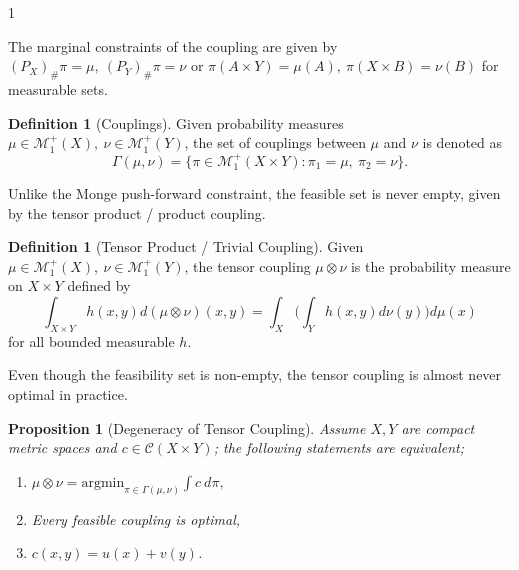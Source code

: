 \documentclass[12pt]{article}
\newtheorem{proposition}[theorem]{Proposition}
\theoremstyle{definition}
\newtheorem{definition}[theorem]{Definition}
\theoremstyle{plain}
\begin{document}
\begin{spacing}{1}
{\setlength{\parindent}{0cm}
The marginal constraints of the coupling are given by $(P_X)_\#\pi = \mu, \ (P_Y)_\#\pi = \nu$ or $\pi(A \times Y) = \mu(A), \ \pi(X \times B) = \nu(B)$ for measurable sets.

\begin{definition}[Couplings]
    Given probability measures $\mu \in \mathcal{M}_1^+(X), \ \nu \in \mathcal{M}_1^+(Y)$, the set of couplings between $\mu$ and $\nu$ is denoted as
    \[
    \Gamma(\mu, \nu) = \{\pi \in \mathcal{M}_1^+(X \times Y):  \pi_1 = \mu, \ \pi_2 = \nu\}.
    \]
\end{definition}

Unlike the Monge push-forward constraint, the feasible set is never empty, given by the tensor product / product coupling.

\begin{definition}[Tensor Product / Trivial Coupling]
    Given $\mu \in \mathcal{M}_1^+(X), \ \nu \in \mathcal{M}_1^+(Y)$, the tensor coupling $\mu \otimes \nu$ is the probability measure on $X \times Y$ defined by
    \[
    \displaystyle \int_{X \times Y} h(x, y)d(\mu \otimes \nu)(x, y) = \int_X \bigg (\int_Y h(x, y)d\nu(y)\bigg)d\mu(x)
    \]
    for all bounded measurable $h$.
\end{definition}

Even though the feasibility set is non-empty, the tensor coupling is almost never optimal in practice.

\newpage

\begin{proposition}[Degeneracy of Tensor Coupling]
    Assume $X, Y$ are compact metric spaces and $c \in \mathcal{C}(X \times Y)$; the following statements are equivalent;
    \begin{enumerate}
        \item $\mu \otimes \nu = \text{argmin}_{\pi \in \Gamma(\mu, \nu)} \displaystyle \int c \ d\pi,$
        \item Every feasible coupling is optimal,
        \item $c(x, y) = u(x) + v(y)$.
    \end{enumerate}
\end{proposition}

}
\end{spacing}
\end{document}
